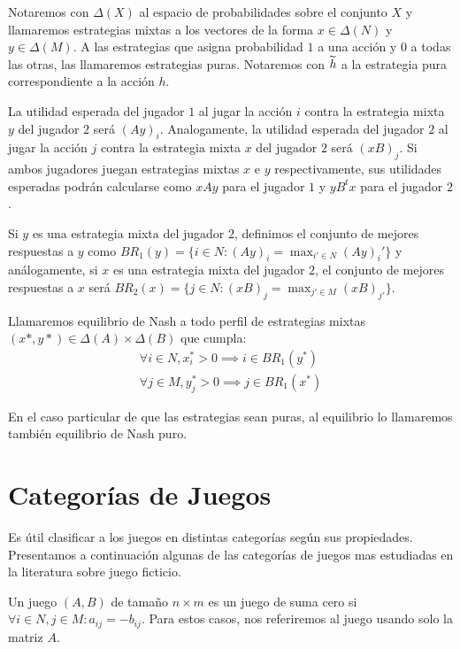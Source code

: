 Notaremos con $\Delta(X)$ al espacio de probabilidades sobre el conjunto $X$ y llamaremos estrategias mixtas a los vectores de la forma $x \in \Delta(N)$ y $y \in \Delta(M)$. A las estrategias que asigna probabilidad $1$ a una acción y $0$ a todas las otras, las llamaremos estrategias puras. Notaremos con $\widetilde{h}$ a la estrategia pura correspondiente a la acción $h$.

La utilidad esperada del jugador $1$ al jugar la acción $i$ contra la estrategia mixta $y$ del jugador $2$ será $(Ay)_i$. Analogamente, la utilidad esperada del jugador $2$ al jugar la acción $j$ contra la estrategia mixta $x$ del jugador $2$ será $(xB)_j$. Si ambos jugadores juegan estrategias mixtas $x$ e $y$ respectivamente, sus utilidades esperadas podrán calcularse como $xAy$ para el jugador $1$ y $yB^tx$ para el jugador $2$.

Si $y$ es una estrategia mixta del jugador $2$, definimos el conjunto de mejores respuestas a $y$ como $BR_1(y) = \{i \in N : (Ay)_i = \max_{i' \in N} (Ay)_i'\}$ y análogamente, si $x$ es una estrategia mixta del jugador $2$, el conjunto de mejores respuestas a $x$ será $BR_2(x) = \{j \in N : (xB)_j = \max_{j' \in M} (xB)_{j'}\}$.

Llamaremos equilibrio de Nash a todo perfil de estrategias mixtas $(x*, y*) \in \Delta(A) \times \Delta(B)$ que cumpla:
\begin{gather}
    \forall i \in N, x^*_i > 0 \implies i \in BR_1(y^*) \\
    \forall j \in M, y^*_j > 0 \implies j \in BR_1(x^*)
\end{gather}

En el caso particular de que las estrategias sean puras, al equilibrio lo llamaremos también equilibrio de Nash puro.

\section{Categorías de Juegos}

Es útil clasificar a los juegos en distintas categorías según sus propiedades. Presentamos a continuación algunas de las categorías de juegos mas estudiadas en la literatura sobre juego ficticio.

\begin{definition}
    Un juego $(A, B)$ de tamaño $n \times m$ es un juego de suma cero si $\forall i \in N, j \in M : a_{ij} = -b_{ij}$. Para estos casos, nos referiremos al juego usando solo la matriz $A$.
\end{definition}

